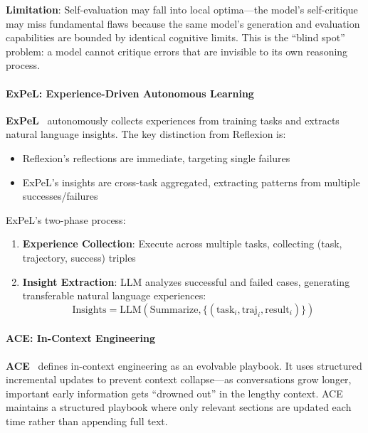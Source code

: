 \textbf{Limitation}: Self-evaluation may fall into local optima---the model's self-critique may miss fundamental flaws because the same model's generation and evaluation capabilities are bounded by identical cognitive limits. This is the ``blind spot'' problem: a model cannot critique errors that are invisible to its own reasoning process.

\paragraph{ExPeL: Experience-Driven Autonomous Learning}

\textbf{ExPeL}~\citep{expel2023} autonomously collects experiences from training tasks and extracts natural language insights. The key distinction from Reflexion is:
\begin{itemize}
\item Reflexion's reflections are immediate, targeting single failures
\item ExPeL's insights are cross-task aggregated, extracting patterns from multiple successes/failures
\end{itemize}

ExPeL's two-phase process:
\begin{enumerate}
\item \textbf{Experience Collection}: Execute across multiple tasks, collecting (task, trajectory, success) triples
\item \textbf{Insight Extraction}: LLM analyzes successful and failed cases, generating transferable natural language experiences:
\begin{equation}
\text{Insights} = \text{LLM}(\text{Summarize}, \{(\text{task}_i, \text{traj}_i, \text{result}_i)\})
\label{eq:expel-insights}
\end{equation}
\end{enumerate}

\paragraph{ACE: In-Context Engineering}

\textbf{ACE}~\citep{ace2024} defines in-context engineering as an evolvable playbook. It uses structured incremental updates to prevent context collapse---as conversations grow longer, important early information gets ``drowned out'' in the lengthy context. ACE maintains a structured playbook where only relevant sections are updated each time rather than appending full text.

